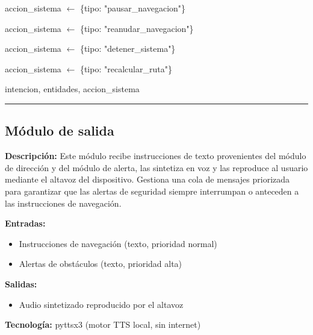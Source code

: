 \begin{algorithmic}[1]

    \State accion\_sistema $\gets$ \{tipo: "pausar\_navegacion"\}

\EndIf

\Statex


    \State accion\_sistema $\gets$ \{tipo: "reanudar\_navegacion"\}

\EndIf

\Statex


    \State accion\_sistema $\gets$ \{tipo: "detener\_sistema"\}

\EndIf

\Statex


    \State accion\_sistema $\gets$ \{tipo: "recalcular\_ruta"\}

\EndIf

\Statex
\State \Return intencion, entidades, accion\_sistema

\end{algorithmic}
\vspace{-0.9cm}
\rule{\textwidth}{0.4pt}

\subsection{Módulo de salida}
\textbf{Descripción:}
Este módulo recibe instrucciones de texto provenientes del módulo de dirección y del
módulo de alerta, las sintetiza en voz y las reproduce al usuario mediante el altavoz
del dispositivo. Gestiona una cola de mensajes priorizada para garantizar que las
alertas de seguridad siempre interrumpan o anteceden a las instrucciones de navegación.

\textbf{Entradas:}
\begin{itemize}
    \item Instrucciones de navegación (texto, prioridad normal)
    \item Alertas de obstáculos (texto, prioridad alta)
\end{itemize}

\textbf{Salidas:}
\begin{itemize}
    \item Audio sintetizado reproducido por el altavoz
\end{itemize}

\textbf{Tecnología:} pyttsx3 (motor TTS local, sin internet)

